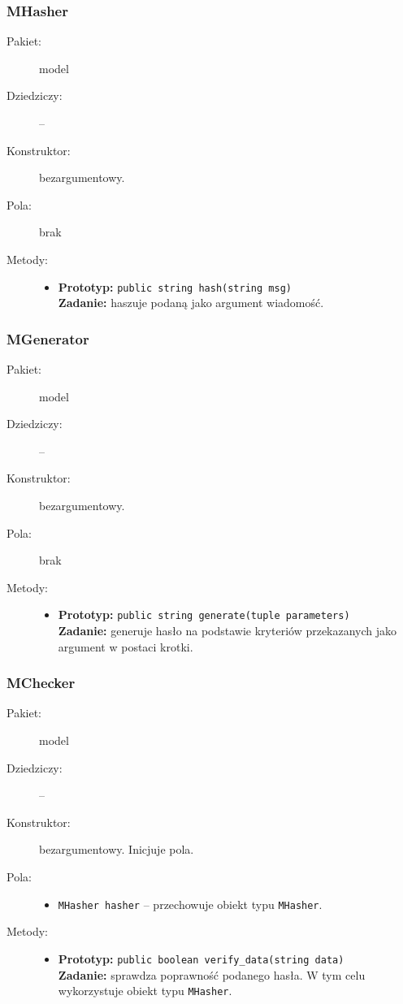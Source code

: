 \documentclass[a4paper]{article}
\newcommand{\prog}{\texttt}
\begin{document}
\subsubsection{MHasher}
\begin{description}
    \item[Pakiet:] model
    \item[Dziedziczy:] --
    \item[Konstruktor:] bezargumentowy.
    \item[Pola:] brak
    \item[Metody:] \hfill
    \begin{itemize}
        \item \textbf{Prototyp:} \prog{public string hash(string msg)}\\\textbf{Zadanie:} haszuje podaną jako argument wiadomość.
    \end{itemize}
\end{description}

\subsubsection{MGenerator}
\begin{description}
    \item[Pakiet:] model
    \item[Dziedziczy:] --
    \item[Konstruktor:] bezargumentowy.
    \item[Pola:] brak
    \item[Metody:] \hfill
    \begin{itemize}
        \item \textbf{Prototyp:} \prog{public string generate(tuple parameters)}\\\textbf{Zadanie:} generuje hasło na podstawie kryteriów przekazanych jako argument w postaci krotki.
    \end{itemize}
\end{description}

\subsubsection{MChecker}
\begin{description}
    \item[Pakiet:] model
    \item[Dziedziczy:] --
    \item[Konstruktor:] bezargumentowy. Inicjuje pola.
    \item[Pola:] \hfill
    \begin{itemize}
        \item \prog{MHasher hasher} -- przechowuje obiekt typu \prog{MHasher}.
    \end{itemize}
    \item[Metody:] \hfill
    \begin{itemize}
        \item \textbf{Prototyp:} \prog{public boolean verify\_data(string data)}\\\textbf{Zadanie:} sprawdza poprawność podanego hasła. W tym celu wykorzystuje obiekt typu \prog{MHasher}.
    \end{itemize}
\end{description}
\end{document}
